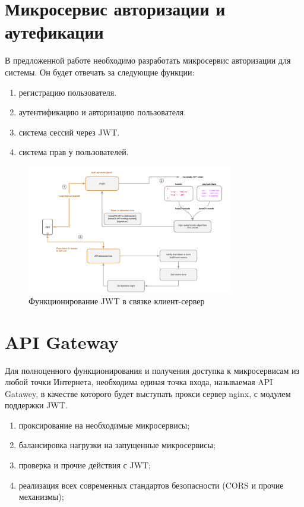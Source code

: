 \section{Микросервис авторизации и аутефикации}

В предложенной работе необходимо разработать микросервис авторизации для системы. Он будет отвечать за следующие функции: 

\begin{enumerate}
    \item регистрацию пользователя.
    \item аутентификацию и авторизацию пользователя.
    \item система сессий через JWT.
    \item система прав у пользователей.
\end{enumerate}

\begin{figure}
  \centering
  \includegraphics[width=0.8\textwidth]{graphics/img/jwt.png}
  \caption{Функционирование JWT в связке клиент-сервер}
  \label{fig:jwt}
\end{figure}


\section{API Gateway}
Для полноценного функционирования и получения доступка к микросервисам из любой точки Интернета, необходима единая точка входа, называемая API Gatawey, в качестве которого будет выступать прокси сервер nginx, с модулем поддержки JWT. \cite{arch:api}
\begin{enumerate}
    \item проксирование на необходимые микросервисы;
    \item балансировка нагрузки на запущенные микросервисы;
    \item проверка и прочие действия с JWT;
    \item реализация всех современных стандартов безопасности (CORS и прочие механизмы);
\end{enumerate}

